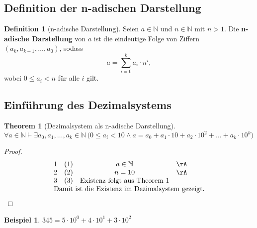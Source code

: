 \documentclass{book}
\theoremstyle{plain}
\newtheorem{theorem}{Theorem}
\theoremstyle{remark}
\theoremstyle{definition}
\newtheorem{definition}{Definition}[section]
\newtheorem*{example}{Beispiel}
\begin{document}
\subsection{Definition der n-adischen Darstellung}

\begin{definition}[n-adische Darstellung]
    Seien \( a \in \mathbb{N} \) und \( n \in \mathbb{N} \) mit \( n > 1 \). Die \textbf{n-adische Darstellung} von \( a \) ist die eindeutige Folge von Ziffern \( (a_k, a_{k-1}, \dots, a_0) \), sodass
    \[
    a = \sum_{i=0}^{k} a_i \cdot n^i,
    \]
    wobei \( 0 \leq a_i < n \) für alle \( i \) gilt.
\end{definition}

\subsection{Einführung des Dezimalsystems}

\begin{theorem}[Dezimalsystem als n-adische Darstellung]
    \(
    \forall a \in \mathbb{N} \vdash \exists a_0, a_1, \dots, a_k \in \mathbb{N} \,
    \big(
        0 \leq a_i < 10 \land 
        a = a_0 + a_1 \cdot 10 + a_2 \cdot 10^2 + \dots + a_k \cdot 10^k
    \big)
    \)
\end{theorem}

\begin{proof}
    \[
    \begin{array}{llcll p{5cm}}
        1 &  (1)  & a \in \mathbb{N} & \rA & \\
        2 &  (2)  & n = 10 & \rA & \\
        3 &  (3)  & \text{Existenz folgt aus Theorem 1} & & \\
        \multicolumn{5}{l}{\text{Damit ist die Existenz im Dezimalsystem gezeigt.}} \\
    \end{array}
    \]
\end{proof}

\begin{example}
    \(
    345 = 5 \cdot 10^0 + 4 \cdot 10^1 + 3 \cdot 10^2
    \)
\end{example}
\end{document}
